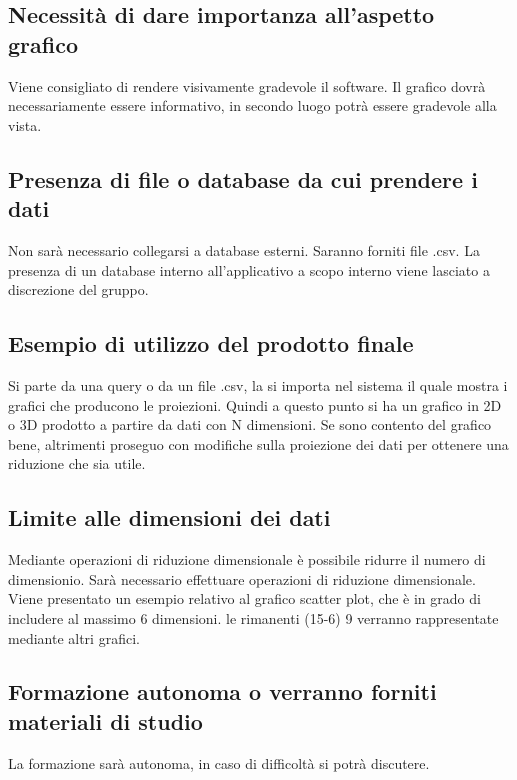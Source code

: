 \documentclass{article}
\begin{document}
    \subsection{Necessità di dare importanza all'aspetto grafico}
    \label{sub:domanda_11}
    Viene consigliato di rendere visivamente gradevole il software. Il grafico dovrà necessariamente essere informativo, in secondo luogo potrà essere gradevole alla vista.

    \subsection{Presenza di file o database da cui prendere i dati}
    \label{sub:domanda_12}
    Non sarà necessario collegarsi a database esterni. Saranno forniti file .csv. La presenza di un database interno all'applicativo a scopo interno viene lasciato a discrezione del gruppo.

    \subsection{Esempio di utilizzo del prodotto finale}
    \label{sub:domanda_13}
    Si parte da una query o da un file .csv, la si importa nel sistema il quale mostra i grafici che producono le proiezioni. Quindi a questo punto si ha un grafico in 2D o 3D prodotto a partire da dati con N dimensioni. Se sono contento del grafico bene, altrimenti proseguo con modifiche sulla proiezione dei dati per ottenere una riduzione che sia utile.

    \subsection{Limite alle dimensioni dei dati}
    \label{sub:domanda_14}
    Mediante operazioni di riduzione dimensionale è possibile ridurre il numero di dimensionio. Sarà necessario effettuare operazioni di riduzione dimensionale.  
    Viene presentato un esempio relativo al grafico scatter plot, che è in grado di includere al massimo 6 dimensioni. le rimanenti (15-6) 9 verranno rappresentate mediante altri grafici.

    \subsection{Formazione autonoma o verranno forniti materiali di studio}
    \label{sub:domanda_15}
    La formazione sarà autonoma, in caso di difficoltà si potrà discutere.
\end{document}
